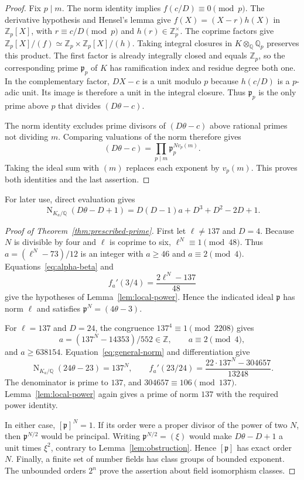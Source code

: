 \documentclass[draft]{publmathdeb}
\theoremstyle{remark}
\numberwithin{equation}{section}
\newcommand{\Q}{\mathbb Q}
\newcommand{\Z}{\mathbb Z}
\DeclareMathOperator{\Nm}{N}
\begin{document}
\begin{proof}
  Fix $p\mid m$. The norm identity implies $f(c/D)\equiv0\pmod p$. The derivative hypothesis and Hensel's lemma give $f(X)=(X-r)h(X)$ in $\Z_p[X]$, with $r\equiv c/D\pmod p$ and $h(r)\in\Z_p^\times$. The coprime factors give $\Z_p[X]/(f)\simeq\Z_p\times\Z_p[X]/(h)$. Taking integral closures in $K\otimes_{\Q}\Q_p$ preserves this product. The first factor is already integrally closed and equals $\Z_p$, so the corresponding prime $\mathfrak p_p$ of $K$ has ramification index and residue degree both one. In the complementary factor, $DX-c$ is a unit modulo $p$ because $h(c/D)$ is a $p$-adic unit. Its image is therefore a unit in the integral closure. Thus $\mathfrak p_p$ is the only prime above $p$ that divides $(D\theta-c)$.

  The norm identity excludes prime divisors of $(D\theta-c)$ above rational primes not dividing $m$. Comparing valuations of the norm therefore gives
  \[
    (D\theta-c)=\prod_{p\mid m}\mathfrak p_p^{Nv_p(m)}.
  \]
  Taking the ideal sum with $(m)$ replaces each exponent by $v_p(m)$. This proves both identities and the last assertion.
\end{proof}

For later use, direct evaluation gives
\begin{equation}\label{eq:general-norm}
  \Nm_{K_a/\Q}(D\theta-D+1)=D(D-1)a+D^3+D^2-2D+1.
\end{equation}

\begin{proof}[Proof of Theorem~\ref{thm:prescribed-prime}]
  First let $\ell\ne137$ and $D=4$. Because $N$ is divisible by four and $\ell$ is coprime to six, $\ell^N\equiv1\pmod{48}$. Thus $a=(\ell^N-73)/12$ is an integer with $a\geq46$ and $a\equiv2\pmod4$. Equations~\eqref{eq:alpha-beta} and
  \[
    f_a'(3/4)=\frac{2\ell^N-137}{48}
  \]
  give the hypotheses of Lemma~\ref{lem:local-power}. Hence the indicated ideal $\mathfrak p$ has norm $\ell$ and satisfies $\mathfrak p^N=(4\theta-3)$.

  For $\ell=137$ and $D=24$, the congruence $137^4\equiv1\pmod{2208}$ gives
  \[
    a=(137^N-14353)/552\in\Z,\qquad a\equiv2\pmod4,
  \]
  and $a\geq638154$. Equation~\eqref{eq:general-norm} and differentiation give
  \[
    \Nm_{K_a/\Q}(24\theta-23)=137^N,\qquad
    f_a'(23/24)=\frac{22\cdot137^N-304657}{13248}.
  \]
  The denominator is prime to $137$, and $304657\equiv106\pmod{137}$. Lemma~\ref{lem:local-power} again gives a prime of norm $137$ with the required power identity.

  In either case, $[\mathfrak p]^N=1$. If its order were a proper divisor of the power of two $N$, then $\mathfrak p^{N/2}$ would be principal. Writing $\mathfrak p^{N/2}=(\xi)$ would make $D\theta-D+1$ a unit times $\xi^2$, contrary to Lemma~\ref{lem:obstruction}. Hence $[\mathfrak p]$ has exact order $N$. Finally, a finite set of number fields has class groups of bounded exponent. The unbounded orders $2^n$ prove the assertion about field isomorphism classes.
\end{proof}
\end{document}
